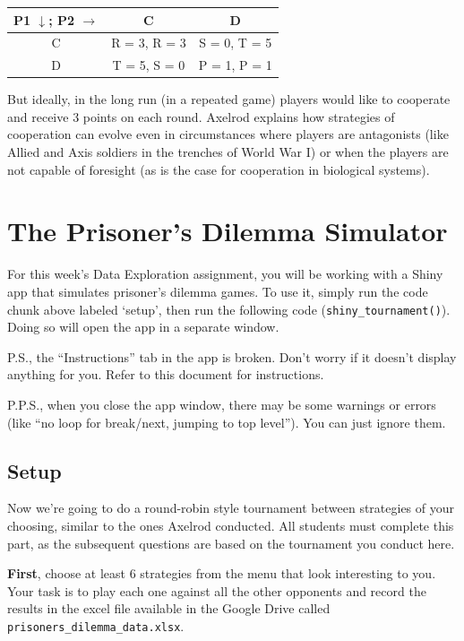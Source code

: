 \documentclass[
]{article}
\begin{document}
\begin{center}
\begin{tabular}{ | c | c | c | } 
\hline
P1 $\downarrow$; P2 $\rightarrow$ & C & D \\ 
\hline
C & R = 3, R = 3 & S = 0, T = 5 \\ 
\hline
D & T = 5, S = 0 & P = 1, P = 1 \\ 
\hline
\end{tabular}
\end{center}

But ideally, in the long run (in a repeated game) players would like to
cooperate and receive 3 points on each round. Axelrod explains how
strategies of cooperation can evolve even in circumstances where players
are antagonists (like Allied and Axis soldiers in the trenches of World
War I) or when the players are not capable of foresight (as is the case
for cooperation in biological systems).

\hypertarget{the-prisoners-dilemma-simulator}{%
\section{The Prisoner's Dilemma
Simulator}\label{the-prisoners-dilemma-simulator}}

For this week's Data Exploration assignment, you will be working with a
Shiny app that simulates prisoner's dilemma games. To use it, simply run
the code chunk above labeled `setup', then run the following code
(\texttt{shiny\_tournament()}). Doing so will open the app in a separate
window.

P.S., the ``Instructions'' tab in the app is broken. Don't worry if it
doesn't display anything for you. Refer to this document for
instructions.

P.P.S., when you close the app window, there may be some warnings or
errors (like ``no loop for break/next, jumping to top level''). You can
just ignore them.

\hypertarget{setup}{%
\subsection{Setup}\label{setup}}

Now we're going to do a round-robin style tournament between strategies
of your choosing, similar to the ones Axelrod conducted. All students
must complete this part, as the subsequent questions are based on the
tournament you conduct here.

\textbf{First}, choose at least 6 strategies from the menu that look
interesting to you. Your task is to play each one against all the other
opponents and record the results in the excel file available in the
Google Drive called \texttt{prisoners\_dilemma\_data.xlsx}.
\end{document}
